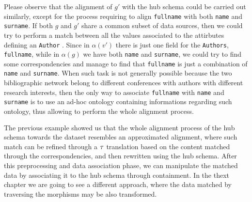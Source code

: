 \begin{example}[continues=ex:examplegraphdata,label=ex:examplereferencedOcaml]

Please observe that the alignment of $g'$ with the hub schema could be carried out similarly, except for the process requiring to align \texttt{fullname} with both \texttt{name} and \texttt{surname}. If both $g$ and $g'$ share a common subset of data sources, then we could try to perform a match between all the values associated to the attirbutes defining an \texttt{Author} \cite{Jagadish}. Since in $\alpha(v')$ there is just one field for the \texttt{Authors}, \texttt{fullname}, while in $\alpha(g)$ we have both \texttt{name} and \texttt{surname}, we could  try to find some correspondencies and manage to find that \texttt{fullname} is just a combination of \texttt{name} and \texttt{surname}. When such task is not generally possible because the two bibliographic network belong to different conferences with authors with different research interests, then the only way to associate \texttt{fullname} with \texttt{name} and \texttt{surname} is to use an ad-hoc ontology containing informations regarding such ontology, thus allowing to perform the whole alignment process.
\end{example}


The previous example showed us that the whole alignment  process of the hub schema towards the dataset resembles an approximated alignment, where such match can be refined through a $\ttransl$ translation  based on the content matched through the correspondencies, and then rewritten using the hub schema. %
After this preprocessing and data association phase, we can manipulate the matched data by associating it to the hub schema through containment. In the thext chapter we are going to see a different approach, where the data matched by traversing the morphisms may be also transformed.